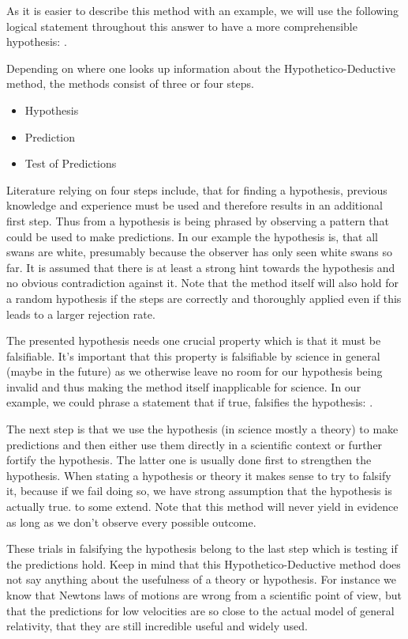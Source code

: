 \documentclass[11pt]{scrartcl}
\begin{document}
As it is easier to describe this method with an example, we will use the following logical statement throughout this answer to have a more comprehensible hypothesis: .

Depending on where one looks up information about the Hypothetico-Deductive method, the methods consist of three or four steps.

\begin{itemize}
  \item Hypothesis
  \item Prediction
  \item Test of Predictions
\end{itemize}

Literature relying on four steps include, that for finding a hypothesis, previous knowledge and experience must be used and therefore results in an additional first step. Thus from a hypothesis is being phrased by observing a pattern that could be used to make predictions. In our example the hypothesis is, that all swans are white, presumably because the observer has only seen white swans so far. It is assumed that there is at least a strong hint towards the hypothesis and no obvious contradiction against it. Note that the method itself will also hold for a random hypothesis if the steps are correctly and thoroughly applied even if this leads to a larger rejection rate.

The presented hypothesis needs one crucial property which is that it must be falsifiable. It's important that this property is falsifiable by science in general (maybe in the future) as we otherwise leave no room for our hypothesis being invalid and thus making the method itself inapplicable for science. In our example, we could phrase a statement that if true, falsifies the hypothesis: .

The next step is that we use the hypothesis (in science mostly a theory) to make predictions and then either use them directly in a scientific context or further fortify the hypothesis. The latter one is usually done first to strengthen the hypothesis. When stating a hypothesis or theory it makes sense to try to falsify it, because if we fail doing so, we have strong assumption that the hypothesis is actually true. to some extend. Note that this method will never yield in evidence as long as we don't observe every possible outcome.

These trials in falsifying the hypothesis belong to the last step which is testing if the predictions hold. Keep in mind that this Hypothetico-Deductive method does not say anything about the usefulness of a theory or hypothesis. For instance we know that Newtons laws of motions are wrong from a scientific point of view, but that the predictions for low velocities are so close to the actual model of general relativity, that they are still incredible useful and widely used.
\end{document}
